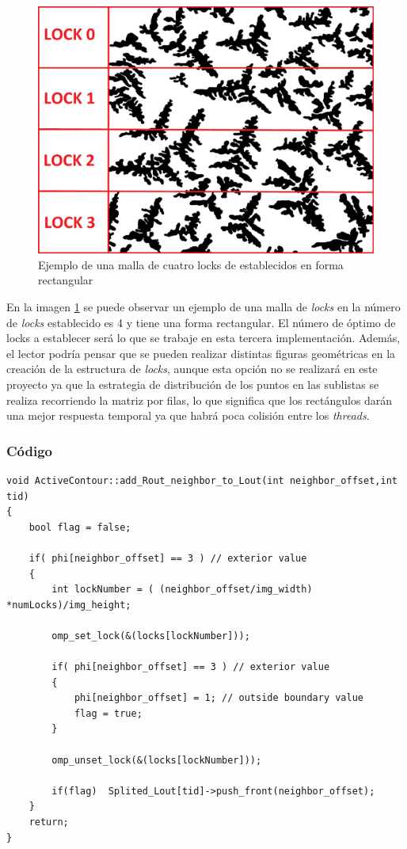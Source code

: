 \begin{figure}[H]
	\captionsetup{justification=centering}
	\centering
	\includegraphics[width=.7\textwidth]{./imagenes/mallaLocks}
	\caption{Ejemplo de una malla de cuatro locks de establecidos en forma rectangular}	
	\label{mallaLocks}
\end{figure}

En la imagen \ref{mallaLocks} se puede observar un ejemplo de una malla de \textit{locks} en la n\'{u}mero de \textit{locks} establecido es 4 y tiene una forma rectangular. El n\'{u}mero de \'{o}ptimo de locks a establecer ser\'{a} lo que se trabaje en esta tercera implementaci\'{o}n. Adem\'{a}s, el lector podr\'{i}a pensar que se pueden realizar distintas figuras geom\'{e}tricas en la creaci\'{o}n de la estructura de \textit{locks}, aunque esta opci\'{o}n no se realizar\'{a} en este proyecto ya que la estrategia de distribuci\'{o}n de los puntos en las sublistas se realiza recorriendo la matriz por filas, lo que significa que los rect\'{a}ngulos dar\'{a}n una mejor respuesta temporal ya que habr\'{a} poca colisi\'{o}n entre los \textit{threads}.

\subsubsection{C\'{o}digo}

\begin{lstlisting}
void ActiveContour::add_Rout_neighbor_to_Lout(int neighbor_offset,int tid)
{
	bool flag = false;	
	
	if( phi[neighbor_offset] == 3 ) // exterior value
	{
		int lockNumber = ( (neighbor_offset/img_width) *numLocks)/img_height;
					
		omp_set_lock(&(locks[lockNumber]));	
					
		if( phi[neighbor_offset] == 3 ) // exterior value
		{
			phi[neighbor_offset] = 1; // outside boundary value
			flag = true;
		}	
		
		omp_unset_lock(&(locks[lockNumber]));	
		
		if(flag)  Splited_Lout[tid]->push_front(neighbor_offset);
	}
	return;	
}
\end{lstlisting}


